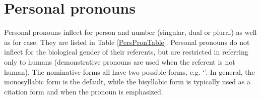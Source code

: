 \section{Personal pronouns}\label{personalPronouns}
Personal pronouns inflect for person and number (singular, dual or plural) as well as for case. They are listed in Table \vref{PersPronTable}. Personal pronouns do not inflect for the biological gender of their referents, but are restricted in referring only to humans (demonstrative pronouns are used when the referent is not human). 
The nominative forms all have two possible forms, e.g. \TILDE{} ‘’. In general, the monosyllabic form is the default, while the bisyllabic form is typically used as a citation form and when the pronoun is emphasized.

